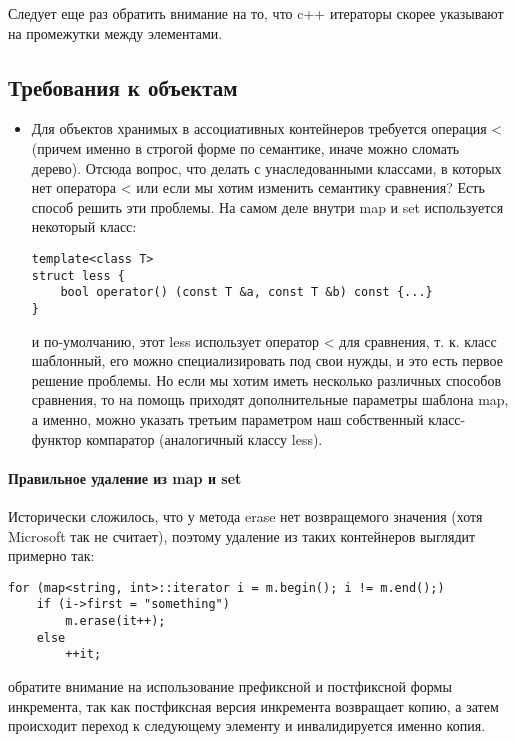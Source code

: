 Следует еще раз обратить внимание на то, что c++ итераторы скорее указывают на промежутки между элементами.

\subsection{Требования к объектам}

\begin{itemize}
\item Для объектов хранимых в ассоциативных контейнеров требуется операция < (причем именно в строгой форме по семантике, иначе можно сломать дерево). Отсюда вопрос,
что делать с унаследованными классами, в которых нет оператора < или если мы хотим изменить семантику сравнения? Есть способ решить эти проблемы. На самом деле внутри
map и set используется некоторый класс:
\begin{lstlisting}
template<class T>
struct less {
	bool operator() (const T &a, const T &b) const {...}
}
\end{lstlisting}
и по-умолчанию, этот less использует оператор < для сравнения, т. к. класс шаблонный, его можно специализировать под свои нужды, и это есть первое решение проблемы.
Но если мы хотим иметь несколько различных способов сравнения, то на помощь приходят дополнительные параметры шаблона map, а именно, можно указать третьим параметром
наш собственный класс-функтор компаратор (аналогичный классу less).
\end{itemize}

\paragraph{Правильное удаление из map и set}

Исторически сложилось, что у метода erase нет возвращемого значения (хотя Microsoft так не считает), поэтому удаление из таких контейнеров выглядит примерно так:
\begin{lstlisting}
for (map<string, int>::iterator i = m.begin(); i != m.end();)
	if (i->first = "something")
		m.erase(it++);
	else
		++it;
\end{lstlisting}
обратите внимание на использование префиксной и постфиксной формы инкремента, так как постфиксная версия инкремента возвращает копию, а затем происходит переход
к следующему элементу и инвалидируется именно копия.